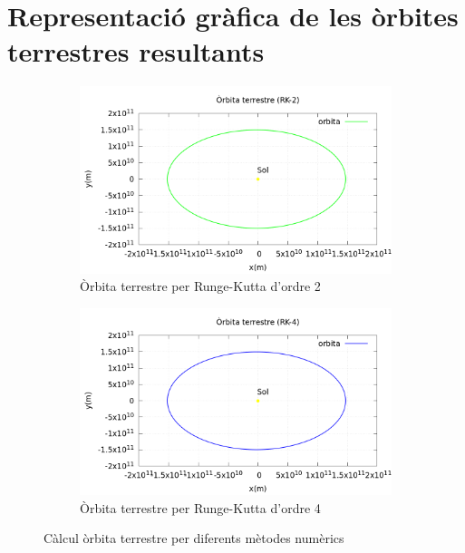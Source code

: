 \documentclass[11pt]{article}
\begin{document}
\section{Representació gràfica de les òrbites terrestres resultants}
\label{sec: orbitesRK}
\begin{figure}[H]
    \centering
    \begin{subfigure}{0.5\textwidth}
        \centering
        \includegraphics[width=\textwidth]{orbitaRK2.PNG}
        \caption{Òrbita terrestre per Runge-Kutta d'ordre 2}
        \label{fig: orbitaRK2}
    \end{subfigure}%
    \vspace{0.01\textwidth}%
    \begin{subfigure}{0.5\textwidth}
        \centering
        \includegraphics[width=\textwidth]{orbitaRK4.PNG}
        \caption{Òrbita terrestre per Runge-Kutta d'ordre 4}
        \label{fig: orbitaRK4}
    \end{subfigure}
    \caption{Càlcul òrbita terrestre per diferents mètodes numèrics}
    \label{fig: graficsRK}
\end{figure}
\end{document}
